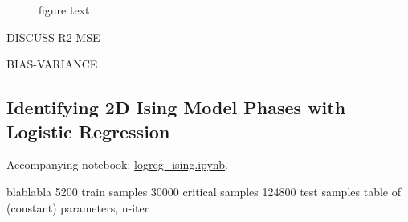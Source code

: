 \begin{figure}[H]
\centering
{}
\qquad
{}
\caption{figure text}
\label{fig:performance_lmbda_1d}
\end{figure}

DISCUSS R2 MSE

BIAS-VARIANCE

\subsection{Identifying 2D Ising Model Phases with Logistic Regression}\label{sec:results logreg}
Accompanying notebook: \href{https://github.com/nicolossus/FYS-STK4155-Project2/blob/master/notebooks/logreg_ising.ipynb}{logreg\_ising.ipynb}. 

blablabla
5200 train samples
30000 critical samples
124800 test samples
table of (constant) parameters, n-iter

